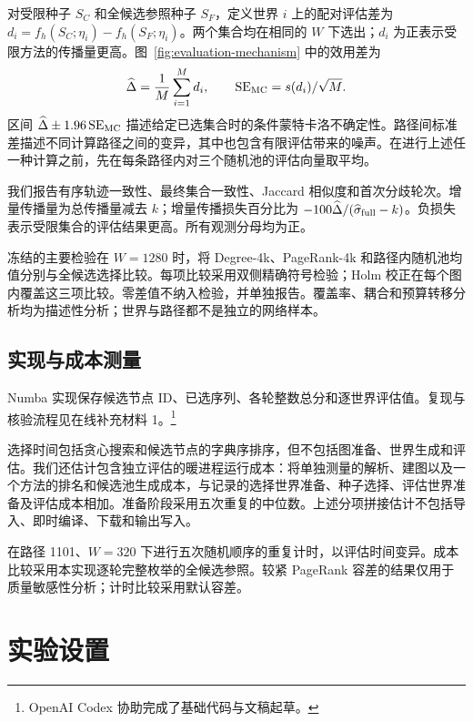 \documentclass[smallextended]{svjour3}
\begin{document}
对受限种子 $S_C$ 和全候选参照种子 $S_F$，定义世界 $i$ 上的配对评估差为 $d_i=f_h(S_C;\eta_i)-f_h(S_F;\eta_i)$。两个集合均在相同的 $W$ 下选出；$d_i$ 为正表示受限方法的传播量更高。图~\ref{fig:evaluation-mechanism} 中的效用差为
\begin{equation}
\widehat\Delta=\frac{1}{M}\sum_{i=1}^{M}d_i,
\qquad \operatorname{SE}_{\rm MC}=s(d_i)/\sqrt M.
\end{equation}
区间 $\widehat\Delta\pm1.96\operatorname{SE}_{\rm MC}$ 描述给定已选集合时的条件蒙特卡洛不确定性。路径间标准差描述不同计算路径之间的变异，其中也包含有限评估带来的噪声。在进行上述任一种计算之前，先在每条路径内对三个随机池的评估向量取平均。

我们报告有序轨迹一致性、最终集合一致性、Jaccard 相似度和首次分歧轮次。增量传播量为总传播量减去 $k$；增量传播损失百分比为 $-100\widehat\Delta/(\widehat\sigma_{\rm full}-k)$。负损失表示受限集合的评估结果更高。所有观测分母均为正。

冻结的主要检验在 $W=1280$ 时，将 Degree-4k、PageRank-4k 和路径内随机池均值分别与全候选选择比较。每项比较采用双侧精确符号检验；Holm 校正在每个图内覆盖这三项比较。零差值不纳入检验，并单独报告。覆盖率、耦合和预算转移分析均为描述性分析；世界与路径都不是独立的网络样本。

\subsection{实现与成本测量}
Numba 实现保存候选节点 ID、已选序列、各轮整数总分和逐世界评估值。复现与核验流程见在线补充材料 1。\footnote{OpenAI Codex 协助完成了基础代码与文稿起草。}

选择时间包括贪心搜索和候选节点的字典序排序，但不包括图准备、世界生成和评估。我们还估计包含独立评估的暖进程运行成本：将单独测量的解析、建图以及一个方法的排名和候选池生成成本，与记录的选择世界准备、种子选择、评估世界准备及评估成本相加。准备阶段采用五次重复的中位数。上述分项拼接估计不包括导入、即时编译、下载和输出写入。

在路径 1101、$W=320$ 下进行五次随机顺序的重复计时，以评估时间变异。成本比较采用本实现逐轮完整枚举的全候选参照。较紧 PageRank 容差的结果仅用于质量敏感性分析；计时比较采用默认容差。

\section{实验设置}\label{sec:experimental-setup}
\end{document}
